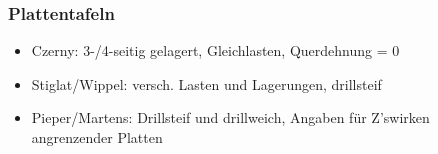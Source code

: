 \begin{minipage}{0.35\linewidth}
		
		
		\subsubsection{Plattentafeln}
		
		\begin{itemize}
			
			\item Czerny: 3-/4-seitig gelagert, Gleichlasten, Querdehnung = 0
			
			\item Stiglat/Wippel: versch. Lasten und Lagerungen, drillsteif
			
			\item Pieper/Martens: Drillsteif und drillweich, Angaben für Z'swirken angrenzender Platten
			
		\end{itemize}
		
	\end{minipage}

